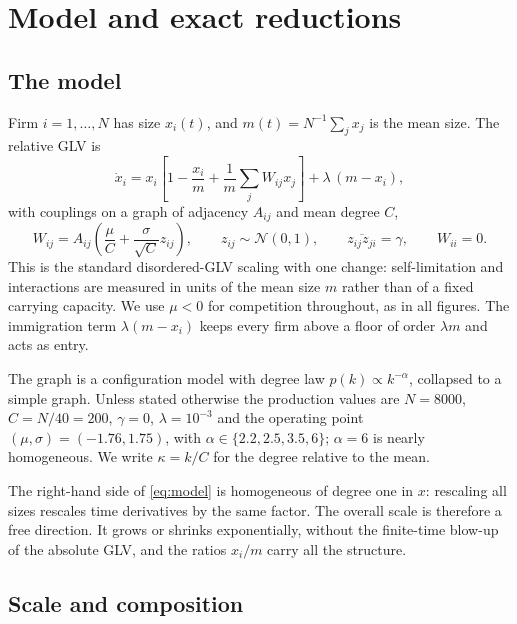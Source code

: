 \documentclass[11pt]{article}
\begin{document}
\section{Model and exact reductions}
\label{sec:model}

\subsection{The model}

Firm $i=1,\dots,N$ has size $x_i(t)$, and $m(t)=N^{-1}\sum_jx_j$ is the mean size.  The relative
GLV is
\begin{equation}
  \dot x_i=x_i\left[1-\frac{x_i}{m}+\frac{1}{m}\sum_jW_{ij}x_j\right]+\lambda\,(m-x_i),
  \label{eq:model}
\end{equation}
with couplings on a graph of adjacency $A_{ij}$ and mean degree $C$,
\begin{equation}
  W_{ij}=A_{ij}\left(\frac{\mu}{C}+\frac{\sigma}{\sqrt C}z_{ij}\right),\qquad
  z_{ij}\sim\mathcal N(0,1),\qquad \overline{z_{ij}z_{ji}}=\gamma,\qquad W_{ii}=0 .
  \label{eq:couplings}
\end{equation}
This is the standard disordered-GLV scaling with one change: self-limitation and interactions
are measured in units of the mean size $m$ rather than of a fixed carrying capacity.  We use
$\mu<0$ for competition throughout, as in all figures.  The immigration term $\lambda(m-x_i)$
keeps every firm above a floor of order $\lambda m$ and acts as entry.

The graph is a configuration model with degree law $p(k)\propto k^{-\alpha}$, collapsed to a
simple graph.  Unless stated otherwise the production values are $N=8000$, $C=N/40=200$,
$\gamma=0$, $\lambda=10^{-3}$ and the operating point $(\mu,\sigma)=(-1.76,1.75)$, with
$\alpha\in\{2.2,2.5,3.5,6\}$; $\alpha=6$ is nearly homogeneous.  We write $\kappa=k/C$ for the
degree relative to the mean.

The right-hand side of \eqref{eq:model} is homogeneous of degree one in $x$: rescaling all sizes
rescales time derivatives by the same factor.  The overall scale is therefore a free direction.
It grows or shrinks exponentially, without the finite-time blow-up of the absolute GLV, and the
ratios $x_i/m$ carry all the structure.

\subsection{Scale and composition}
\label{sec:split}
\end{document}
